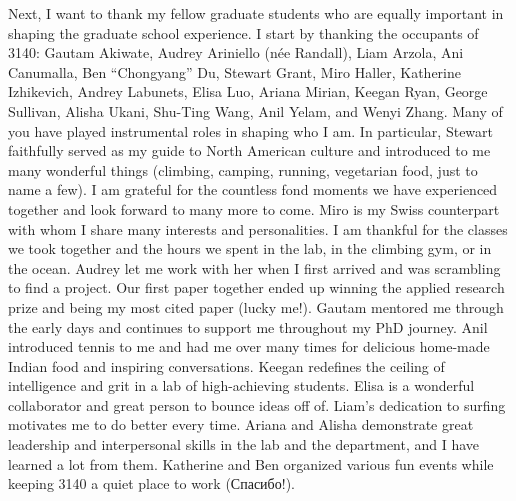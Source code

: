 \begin{acknowledgements}
Next, I want to thank my fellow graduate students who are equally important in shaping the graduate school experience. 
I start by thanking the occupants of 3140: Gautam Akiwate, Audrey Ariniello (née Randall), Liam Arzola, Ani Canumalla, Ben ``Chongyang'' Du, Stewart Grant, Miro Haller, Katherine Izhikevich, Andrey Labunets, Elisa Luo, Ariana Mirian, Keegan Ryan, George Sullivan, Alisha Ukani, Shu-Ting Wang, Anil Yelam, and Wenyi Zhang.  
Many of you have played instrumental roles in shaping who I am. In particular, Stewart faithfully served as my guide to North American culture and introduced to me many wonderful things (climbing, camping, running, vegetarian food, just to name a few). I am grateful for the countless fond moments we have experienced together and look forward to many more to come. Miro is my Swiss counterpart with whom I share many interests and personalities. I am thankful for the classes we took together and the hours we spent in the lab, in the climbing gym, or in the ocean. Audrey let me work with her when I first arrived and was scrambling to find a project. Our first paper together ended up winning the applied research prize and being my most cited paper (lucky me!). Gautam mentored me through the early days and continues to support me throughout my PhD journey. Anil introduced tennis to me and had me over many times for delicious home-made Indian food and inspiring conversations. Keegan redefines the ceiling of intelligence and grit in a lab of high-achieving students. Elisa is a wonderful collaborator and great person to bounce ideas off of. Liam's dedication to surfing motivates me to do better every time. Ariana and Alisha demonstrate great leadership and interpersonal skills in the lab and the department, and I have learned a lot from them. Katherine and Ben organized various fun events while keeping 3140 a quiet place to work ({Спасибо}!). 


\end{acknowledgements}
